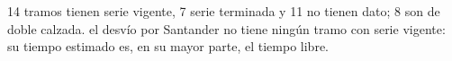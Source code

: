 {14 tramos tienen serie vigente, 7 serie terminada y 11 no tienen dato; 8 son de doble calzada.}
{el desvío por Santander no tiene ningún tramo con serie vigente: su tiempo estimado es, en su mayor parte, el tiempo libre.}
